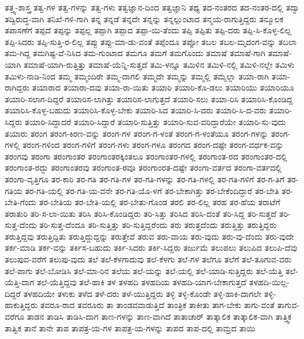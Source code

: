 {ತತ್ತ್ವ-ಶಾಸ್ತ್ರ
ತತ್ವ-ಗಳ
ತತ್ವ-ಗಳನ್ನು
ತತ್ವ-ಗಳು
ತತ್ವಜ್ಞಾನ-ದಿಂದ
ತತ್ವಜ್ಞಾನಿ
ತಥ್ಯ
ತದ-ನಂತರದ
ತದ-ನಂತರ-ದಲ್ಲಿ
ತದ್ವಾ
ತದ್ವಿರುದ್ಧ-ವಾಗಿ
ತನಿಖೆ-ಗಳಿ-ಗಾಗಿ
ತನ್ನ
ತನ್ನಡೆ
ತನ್ನದೇ
ತನ್ನನ್ನು
ತನ್ನಲ್ಲುಂಟಾದ
ತನ್ಮಯ-ರಾಗುತ್ತಿದ್ದರು
ತನ್ಮೂಲಕ
ತಪಾಸಣೆಗೆ
ತಪ್ಪದೆ
ತಪ್ಪನ್ನು
ತಪ್ಪಲ್ಲ
ತಪ್ಪಾಗಿ
ತಪ್ಪಾದ
ತಪ್ಪಾ-ಯಿ-ತೆಂದು
ತಪ್ಪಿ
ತಪ್ಪಿತು
ತಪ್ಪಿ-ದರು
ತಪ್ಪಿ-ಸಿ-ಕೊಳ್ಳ-ಲಿಲ್ಲ
ತಪ್ಪಿ-ಸಿದರು
ತಪ್ಪಿ-ಸುತ್ತಿ-ರ-ಲಿಲ್ಲ
ತಪ್ಪು
ತಪ್ಪು-ಮಾ-ಡು-ವಂತೆ
ತಪ್ಪೆಂದೂ
ತಪ್ಪೋ
ತಬಲ
ತಬಲ-ಮೃದಂಗ-ವನ್ನು
ತಬಲಾ
ತಮ-ಗಿದ್ದ
ತಮಗಿಷ್ಟ-ವೆ-ನಿಸಿದ
ತಮ-ಗುಂಟಾದ
ತಮಗೂ
ತಮಗೆ
ತಮಗೊಂದು
ತಮಾಷೆ
ತಮಾಷೆ-ಗಾಗಿ
ತಮಾಷೆ-ಯಾಗಿ
ತಮಾಷೆ-ಯಾಗಿ-ರುತ್ತಿತ್ತು
ತಮಾಷೆ-ಯೆನ್ನಿ-ಸುತ್ತದೆ
ತಮಿ-ಳನ್ನೂ
ತಮಿಳಿನ
ತಮಿಳಿ-ನಲ್ಲಿ
ತಮಿಳಿ-ನಲ್ಲೇ
ತಮಿಳು
ತಮಿಳು-ನಾಡಿ-ನಿಂದ
ತಮ್ಮ
ತಮ್ಮಂದಿರೇ
ತಮ್ಮ-ದಾಗಲಿ
ತಮ್ಮದೇ
ತಮ್ಮನ್ನು
ತಮ್ಮಲ್ಲಿ
ತಮ್ಮೆಲ್ಲಾ
ತಯಾ-ರಾಗಿ
ತಯಾ-ರಾಗಿದ್ದರು
ತಯಾರಾದ
ತಯಾರಾ-ದವು
ತಯಾ-ರಾ-ಯಿತು
ತಯಾರಿ
ತಯಾರಿ-ಕೊ-ಡಲು
ತಯಾರಿಯು
ತಯಾರಿಯೂ
ತಯಾರಿ-ಸಲಾಗ-ದಿದ್ದರೆ
ತಯಾರಿಸ-ಲಾಗಿತ್ತು
ತಯಾರಿಸ-ಲಾಗುತ್ತದೆ
ತಯಾರಿ-ಸಲು
ತಯಾ-ರಿಸಿ
ತಯಾರಿಸಿ-ಕೊಂಡಿದ್ದ
ತಯಾರಿಸಿ-ಕೊಳ್ಳ-ಬಹುದು
ತಯಾರಿಸಿ-ಕೊಳ್ಳ-ಬೇಕು
ತಯಾರಿ-ಸಿದ
ತಯಾರಿ-ಸಿ-ದರು
ತಯಾರಿ-ಸಿ-ದ-ವರು
ತಯಾರಿ-ಸಿದ್ದರು
ತಯಾರಿ-ಸಿದ್ದಾದರೆ
ತಯಾರಿ-ಸಿದ್ದಾರೆ
ತಯಾರಿ-ಸುತ್ತಿತ್ತು
ತಯಾರಿ-ಸುವ-ವರಿದ್ದಾರೆಯೇ
ತಯಾರಿ-ಸು-ವುದು
ತಯಾರು
ತರಂಗ
ತರಂಗ-ಕಿರಣ-ವನ್ನು
ತರಂಗ-ಗಳ
ತರಂಗ-ಗ-ಳಂತೆ
ತರಂಗ-ಗ-ಳಂತೆಯೂ
ತರಂಗ-ಗಳನ್ನು
ತರಂಗ-ಗಳಲ್ಲಿ
ತರಂಗ-ಗಳಿಂದ
ತರಂಗ-ಗಳಿಗೆ
ತರಂಗ-ಗಳು
ತರಂಗ-ಗಳೂ
ತರಂಗದ
ತರಂಗ-ದಷ್ಟೇ
ತರಂಗ-ವರ್ಧಕ-ವನ್ನು
ತರಂಗವು
ತರಂಗಾ
ತರಂಗಾಂತರ
ತರಂಗಾಂತರಕ್ಕಿಂತಲೂ
ತರಂಗಾಂತರ-ಗಳಲ್ಲಿ
ತರಂಗಾಂತ-ರದ
ತರಂಗಾಂತರ-ದಲ್ಲಿ
ತರಂಗಾಂತ-ರದ್ದು
ತರಂಗಾಂತರವು
ತರಂಗಾಂತ-ರವೂ
ತರಂಗಾಂರತ-ದಷ್ಟೇ
ತರಂಗಾ-ವರ್ತದ
ತರಂಗಾ-ವರ್ತದಲ್ಲಿ
ತರಂಗಾ-ವೃತ್ತಿಗೂ
ತರ-ಕಾರಿ
ತರ-ಗತಿ
ತರ-ಗತಿ-ಗಳ
ತರ-ಗತಿ-ಗಳನ್ನು
ತರ-ಗತಿ-ಗಳಲ್ಲಿ
ತರ-ಗತಿ-ಗಳಿಗೆ
ತರ-ಗ-ತಿಗೆ
ತರ-ಗತಿಯ
ತರ-ಗತಿ-ಯಲ್ಲಿ
ತರ-ಗತಿ-ಯ-ವನೇ
ತರ-ಗತಿ-ಯೊ-ಳಗೆ
ತರ-ಬೇಕಾಗಿತ್ತು
ತರ-ಬೇಕೆಂದಿದ್ದಾರೆ
ತರ-ಬೇತಿ
ತರ-ಬೇತಿ-ಗೆಂದು
ತರ-ಬೇತಿಯ
ತರ-ಬೇತಿ-ಯಲ್ಲಿ
ತರ-ಬೇತು-ಗೊಂಡ
ತರಲಿ
ತರ-ಲಿಲ್ಲ
ತರಹ
ತರ-ಹೆಯ
ತರಾಟೆಗೆ
ತರಾತುರಿ
ತರಿ-ಸ-ಲಾ-ಯಿತು
ತರಿಸಿ
ತರಿಸಿ-ಕೊಂಡಿದ್ದರು
ತರಿ-ಸಿತ್ತು
ತರಿಸಿದ
ತರಿಸಿ-ದಂತೆ
ತರಿ-ಸಿದ್ದ
ತರಿ-ಸುತ್ತದೆ
ತರಿ-ಸುತ್ತ-ದೆಂದು
ತರಿ-ಸುತ್ತ-ದೆಂದೂ
ತರಿ-ಸುತ್ತಿತ್ತು
ತರಿ-ಸುತ್ತಿದ್ದರೆಂದು
ತರು
ತರುತ್ತದೆಂದು
ತರುತ್ತಿತ್ತು
ತರುತ್ತಿದ್ದರು
ತರುತ್ತಿದ್ದವು
ತರುತ್ತಿದ್ದಿತು
ತರುತ್ತಿದ್ದುದ್ದನ್ನು
ತರುತ್ತೇವೆ
ತರುವ
ತರು-ವಾಯ
ತರು-ವುದು
ತರು-ವು-ದೆಂದು
ತರು-ವುದೇ
ತರ್ಕ-ಮಾಡಿ
ತರ್ಕ-ವನ್ನು
ತರ್ಕಿಸ-ಬಹುದು
ತರ್ಕಿ-ಸಿದರು
ತರ್ಕಿ-ಸಿದ್ದರು
ತರ್ಜುಮೆ
ತಲುಪಲು
ತಲುಪಿದ
ತಲುಪಿ-ದೆವು
ತಲುಪುವ-ವರೆಗೆ
ತಲುಪು-ವುದು
ತಲೆ
ತಲೆ-ಕೆಳಗಾದುವು
ತಲೆ-ಕೆಳಗು
ತಲೆ-ಗಳ
ತಲೆಗೂ
ತಲೆಗೆ
ತಲೆ-ತೂಗುವ-ವರು
ತಲೆ-ಪಾಗು
ತಲೆ-ಬೋಡಿಸಿ
ತಲೆ-ಮಾ-ರಿನ
ತಲೆಯ
ತಲೆ-ಯನ್ನು
ತಲೆ-ಯಲ್ಲಿ
ತಲೆ-ಯಾಡಿ-ಸುತ್ತಿದ್ದರು
ತಲೆ-ಯೆತ್ತಿ
ತಲೆ-ಯೆತ್ತಿ-ದಾಗ
ತಲೆ-ಯೆತ್ತಿದ್ದವು
ತಲೆ-ಹಾಕಿ
ತಳ
ತಳಹದಿ
ತಳಹದಿಯ
ತಳಹದಿ-ಯಾಗ-ಬೇಕಾಗುತ್ತದೆ
ತಳಹದಿ-ಯಿಲ್ಲ-ದಿದ್ದರೆ
ತಳಹದಿಯೇ
ತಳುಕು
ತಳೆದ
ತಳೆ-ದರು
ತಳೆ-ಯುತ್ತಿದ್ದರು
ತಳ್ಳಿ
ತಳ್ಳಿ-ಕೊಂಡೇ
ತಳ್ಳಿ-ಹಾಕಿ-ದಾಗಲೇ
ತಳ್ಳಿ-ಹಾಕುತ್ತಿದ್ದರು
ತವರೂ-ರಾದ
ತವರೂರು
ತಾ
ತಾಂಡವವಾಡುತ್ತಿದೆ
ತಾಂತ್ರಿಕ
ತಾಕೀತು
ತಾಗ-ಬೇಕು
ತಾಗು-ವಂತೆ
ತಾಗುವ-ವರೆಗೂ
ತಾಡನ
ತಾಡಿಸಿ
ತಾಡಿಸಿ-ದಾಗ
ತಾಣ-ಗಳನ್ನು
ತಾಣ-ವಾಗಿದೆ
ತಾತಾಚಾರ್
ತಾತ್ಕಾಲಿಕ
ತಾತ್ಕಾಲಿಕ-ವಾಗಿ
ತಾತ್ತ್ವಿಕ
ತಾತ್ವಿಕ
ತಾನೆ
ತಾನೇ
ತಾಪ
ತಾಪತ್ರ-ಯ-ಗಳ
ತಾಪತ್ರ-ಯ-ಗಳನ್ನು
ತಾಪದ
ತಾಪ-ದಲ್ಲಿ
ತಾಮ್ರದ
ತಾಯಿ
}
